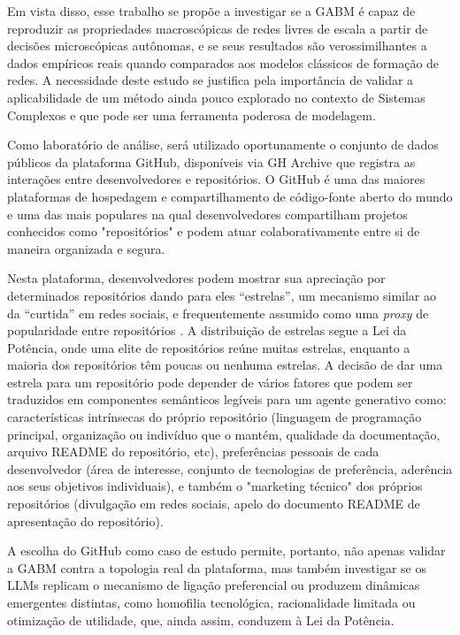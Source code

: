 \documentclass[12pt,oneside,a4paper,brazil,sumario=tradicional]{abntex2}
\begin{document}
Em vista disso, esse trabalho se propõe a investigar se a GABM é capaz  de reproduzir as propriedades macroscópicas de redes livres de escala a partir de decisões microscópicas autônomas, e se seus resultados são verossimilhantes a dados empíricos reais quando comparados aos modelos clássicos de formação de redes. A necessidade deste estudo se justifica pela importância de validar a aplicabilidade de um método ainda pouco explorado no contexto de Sistemas Complexos e que pode ser uma ferramenta poderosa de modelagem.

Como laboratório de análise, será utilizado oportunamente o conjunto de dados públicos da plataforma GitHub, disponíveis via GH Archive \cite{grigorik_gharchive} que registra as interações entre desenvolvedores e repositórios. O GitHub é uma das maiores plataformas de hospedagem e compartilhamento de código-fonte aberto do mundo e uma das mais populares \cite{github2025, stackoverflow2025} na qual desenvolvedores compartilham projetos conhecidos como "repositórios" e podem atuar colaborativamente entre si de maneira organizada e segura.

Nesta plataforma, desenvolvedores podem mostrar sua apreciação por determinados repositórios dando para eles “estrelas”, um mecanismo similar ao da “curtida” em redes sociais, e frequentemente assumido como uma \textit{proxy }de popularidade entre repositórios \cite{borges2018, borges2016, gu2026}. A distribuição de estrelas segue a Lei da Potência, onde uma elite de repositórios reúne muitas estrelas, enquanto a maioria dos repositórios têm poucas ou nenhuma estrelas. A decisão de dar uma estrela para um repositório pode depender de vários fatores que podem ser traduzidos em componentes semânticos legíveis para um agente generativo como: características intrínsecas do próprio repositório (linguagem de programação principal, organização ou indivíduo que o mantém, qualidade da documentação, arquivo README do repositório, etc), preferências pessoais de cada desenvolvedor (área de interesse, conjunto de tecnologias de preferência, aderência aos seus objetivos individuais), e também o "marketing técnico" dos próprios repositórios (divulgação em redes sociais, apelo do documento README de apresentação do repositório).

A escolha do GitHub como caso de estudo permite, portanto, não apenas validar a GABM contra a topologia real da plataforma, mas também investigar se os LLMs replicam o mecanismo de ligação preferencial ou produzem dinâmicas emergentes distintas, como homofilia tecnológica, racionalidade limitada ou otimização de utilidade, que, ainda assim, conduzem à Lei da Potência.
\end{document}

